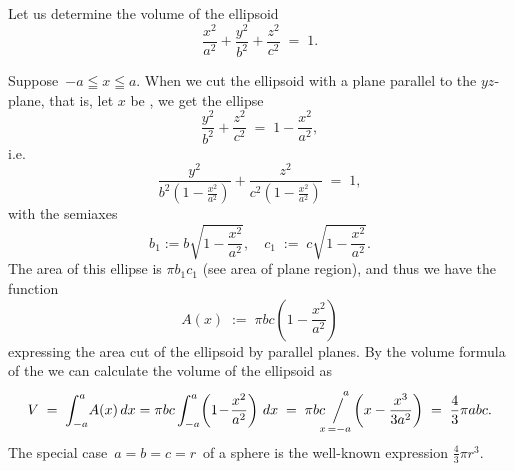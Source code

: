 \documentclass[12pt]{article}
\newcommand{\sijoitus}[2]%
{\operatornamewithlimits{\Big/}_{\!\!\!#1}^{\,#2}}
\begin{document}
 
Let us determine the volume of the ellipsoid
$$\frac{x^2}{a^2}+\frac{y^2}{b^2}+\frac{z^2}{c^2} \;=\; 1.$$

Suppose\, $-a \leqq x \leqq a$.  When we cut the ellipsoid with a plane parallel to the $yz$-plane, that is, let $x$ be , we get the ellipse
$$\frac{y^2}{b^2}+\frac{z^2}{c^2} \;=\; 1\!-\!\frac{x^2}{a^2},$$
i.e. 
$$\frac{y^2}{b^2\left(1\!-\!\frac{x^2}{a^2}\right)}+\frac{z^2}{c^2\left(1\!-\!\frac{x^2}{a^2}\right)} \;=\; 1,$$
with the semiaxes
$$b_1 := b\sqrt{1\!-\!\frac{x^2}{a^2}},\quad c_1 \;:=\; c\sqrt{1\!-\!\frac{x^2}{a^2}}.$$
The area of this ellipse is $\pi b_1 c_1$ (see area of plane region), and thus we have the function
$$A(x) \;:=\; \pi b c \left(1-\frac{x^2}{a^2}\right)$$
expressing the area cut of the ellipsoid by parallel planes.  By the volume formula of the  we can calculate the volume of the ellipsoid as
$$V \;=\; \int_{-a}^a\!A(x)\,dx = \pi b c \int_{-a}^a\!\left(1\!-\!\frac{x^2}{a^2}\right)\,dx 
 \;=\; \pi b c\! \sijoitus{x\,=-a}{\quad a}\left(x-\frac{x^3}{3a^2}\right) \;=\; \frac{4}{3}\pi a b c.$$
The special case\, $a = b = c = r$\, of a sphere is the well-known expression $\frac{4}{3}\pi r^3.$
\end{document}
